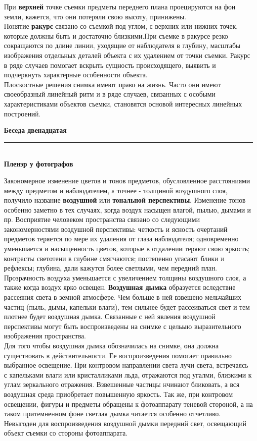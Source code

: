 \documentclass{article}
\newcommand{\important}[1]{\textbf{#1}}
\renewcommand{\section}[2]{
	\vspace{6em}
	\begin{flushright}
		\Large
		\baselineskip=0.5\baselineskip
		\textbf{#1}
		\\
		\rule[0.5\baselineskip]{\textwidth}{0.15pt}
		\\
		\textbf{#2}
	\end{flushright}
}
\begin{document}
При \important{верхней} точке съемки предметы переднего плана проецируются на фон земли, кажется, что они потеряли свою высоту, принижены.\\
Понятие \important{ракурс} связано со съемкой под углом, с верхних или нижних точек, которые должны быть и достаточно близкими.При съемке в ракурсе резко сокращаются по длине линии, уходящие от наблюдателя в глубину, масштабы изображения отдельных деталей объекта с их удалением от точки съемки. Ракурс в ряде случаев помогает вскрыть сущность происходящего, выявить и подчеркнуть характерные особенности объекта.\\
Плоскостные решения снимка имеют право на жизнь. Часто они имеют своеобразный линейный ритм и в ряде случаев, связанных с особыми характеристиками объектов съемки, становятся основой интересных линейных построений.
\section{Беседа двенадцатая}{Пленэр у фотографов}
Закономерное изменение цветов и тонов предметов, обусловленное расстояниями между предметом и наблюдателем, а точнее - толщиной воздушного слоя, получило название \important{воздушной} или \important{тональной перспективы}. Изменение тонов особенно заметно в тех случаях, когда воздух насыщен влагой, пылью, дымами и пр. Восприятие человеком пространства связано со следующими закономерностями воздушной перспективы: четкость и ясность очертаний предметов теряется по мере их удаления от глаза наблюдателя; одновременно уменьшается и насыщенность  цветов, которые в отдалении теряют свою яркость; контрасты светотени в глубине смягчаются; постепенно угасают блики и рефлексы; глубина, дали кажутся более светлыми, чем передний план.\\
Прозрачность воздуха уменьшается с увеличением толщины воздушного слоя, а также когда воздух ярко освещен. \important{Воздушная дымка} образуется вследствие рассеяния света в земной атмосфере. Чем больше в ней взвешено мельчайших частиц (пыль, дымы, капельки влаги), тем сильнее будет рассеиваться свет и тем плотнее будет воздушная дымка. Связанные с ней явления воздушной перспективы могут быть воспроизведены на снимке с цельыю выразительного изображения пространства.\\
Для того чтобы воздушная дымка обозначилась на снимке, она должна существовать в действительности. Ее воспроизведения помогает правильно выбранное освещение. При контровом направлении света лучи света, встречаясь с капельками влаги или кристалликами льда, отражаются под угалми, близкими к углам зеркального отражения. Взвешенные частицы нчинают бликовать, а вся воздушная среда приобретает повышенную яркость. Так же, при контровом освещении, фигуры и предметы обращены к фотоаппарату теневой стороной, а на таком притемненном фоне светлая дымка читается особенно отчетливо. Невыгоден для воспроизведения воздушной дымки передний свет, освещающий объект съемки со стороны фотоаппарата.
\end{document}
